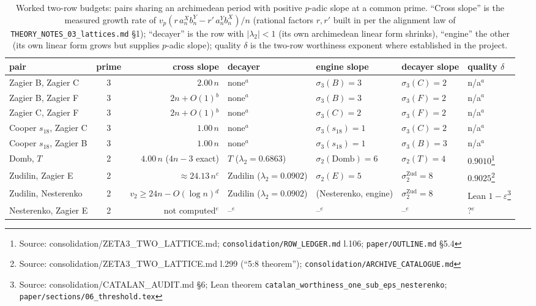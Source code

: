 \newcommand{\src}[1]{\footnote{Source: #1}}
\begin{table}[t]
\centering
\caption{Worked two-row budgets: pairs sharing an archimedean period with positive $p$-adic
slope at a common prime. ``Cross slope'' is the measured growth rate of
$v_p(r\,a^X_nb^Y_n-r'\,a^Y_nb^X_n)/n$ (rational factors $r,r'$ built in per the alignment law of
\texttt{THEORY\_NOTES\_03\_lattices.md} \S1); ``decayer'' is the row with $|\lambda_2|<1$ (its own
archimedean linear form shrinks), ``engine'' the other (its own linear form grows but supplies
$p$-adic slope); quality $\delta$ is the two-row worthiness exponent where established in the
project.}
\label{tab:budgets}
\small
\begin{tabular}{l c r l l l l}
\hline
pair & prime & cross slope & decayer & engine slope & decayer slope & quality $\delta$ \\
\hline
Zagier B, Zagier C & 3 & $2.00\,n$ & none$^{a}$ & $\sigma_3(B){=}3$ & $\sigma_3(C){=}2$ & n/a$^{a}$ \\
Zagier B, Zagier F & 3 & $2n+O(1)$$^{b}$ & none$^{a}$ & $\sigma_3(B){=}3$ & $\sigma_3(F){=}2$ & n/a$^{a}$ \\
Zagier C, Zagier F & 3 & $2n+O(1)$$^{b}$ & none$^{a}$ & $\sigma_3(C){=}2$ & $\sigma_3(F){=}2$ & n/a$^{a}$ \\
Cooper $s_{18}$, Zagier C & 3 & $1.00\,n$ & none$^{a}$ & $\sigma_3(s_{18}){=}1$ & $\sigma_3(C){=}2$ & n/a$^{a}$ \\
Cooper $s_{18}$, Zagier B & 3 & $1.00\,n$ & none$^{a}$ & $\sigma_3(s_{18}){=}1$ & $\sigma_3(B){=}3$ & n/a$^{a}$ \\
Domb, $T$ & 2 & $4.00\,n$ ($4n{-}3$ exact) & $T$ ($\lambda_2{=}0.6863$) & $\sigma_2(\mathrm{Domb}){=}6$ & $\sigma_2(T){=}4$ & $0.9010$\src{consolidation/ZETA3\_TWO\_LATTICE.md; \texttt{consolidation/ROW\_LEDGER.md} l.106; \texttt{paper/OUTLINE.md} \S5.4} \\
Zudilin, Zagier E & 2 & $\approx24.13\,n$$^{c}$ & Zudilin ($\lambda_2{=}0.0902$) & $\sigma_2(E){=}5$ & $\sigma_2^{\mathrm{Zud}}{=}8$ & $0.9025$\src{consolidation/ZETA3\_TWO\_LATTICE.md l.299 (``5:8 theorem''); \texttt{consolidation/ARCHIVE\_CATALOGUE.md}} \\
Zudilin, Nesterenko & 2 & $v_2\ge24n{-}O(\log n)$$^{d}$ & Zudilin ($\lambda_2{=}0.0902$) & (Nesterenko, engine) & $\sigma_2^{\mathrm{Zud}}{=}8$ & Lean $1-\varepsilon$\src{consolidation/CATALAN\_AUDIT.md \S6; Lean theorem \texttt{catalan\_worthiness\_one\_sub\_eps\_nesterenko}; \texttt{paper/sections/06\_threshold.tex}} \\
Nesterenko, Zagier E & 2 & not computed$^{e}$ & --$^{e}$ & --$^{e}$ & --$^{e}$ & ?$^{e}$ \\
\hline
\end{tabular}


\end{table}
